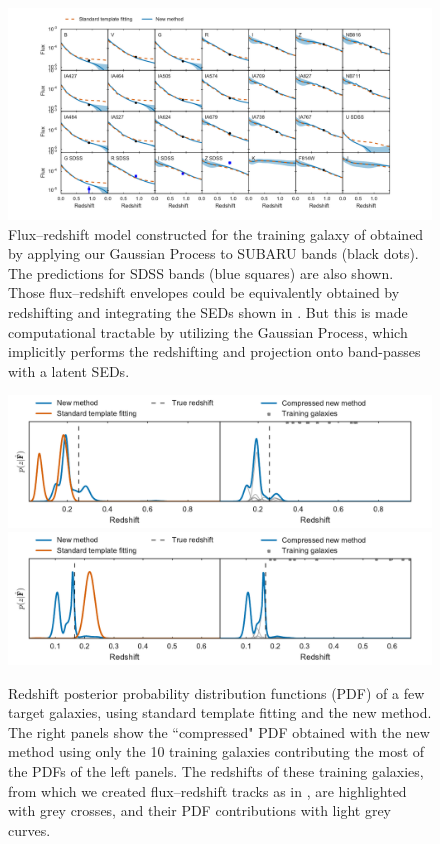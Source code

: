 \documentclass[aps,prd,showpacs,superscriptaddress,groupedaddress]{revtex4}  %
\begin{document}
\begin{figure}
\includegraphics[width=18cm, trim = 2cm 0cm 2cm 0cm, clip]{traininggalaxy_fluxredshiftmodel-6.pdf}
\caption{Flux--redshift model constructed for the training galaxy of  obtained by applying our Gaussian Process to SUBARU bands (black dots). The predictions for SDSS bands (blue squares) are also shown. Those flux--redshift envelopes could be equivalently obtained by redshifting and integrating the SEDs shown in . But this is made computational tractable by utilizing the Gaussian Process, which implicitly performs the redshifting and projection onto band-passes with a latent SEDs.}
\label{fig:traininggalaxy_fluxredshiftmodel}
\end{figure} 

\begin{figure}
\includegraphics[width=16cm, trim = 0cm 0.6cm 0cm 0cm, clip]{data-pdfs-13.pdf}
\includegraphics[width=16cm, trim = 0cm 0.0cm 0cm 1.2cm, clip]{data-pdfs-67.pdf}
\caption{Redshift posterior probability distribution functions (PDF) of a few target galaxies, using standard template fitting and the new method. 
The right panels show the ``compressed" PDF obtained with the new method using only the 10 training galaxies contributing the most of the PDFs of the left panels.
The redshifts of these training galaxies, from which we created flux--redshift tracks as in , are highlighted with grey crosses, and their PDF contributions with light grey curves. }
\label{fig:datapdfs}
\end{figure}
\end{document}
